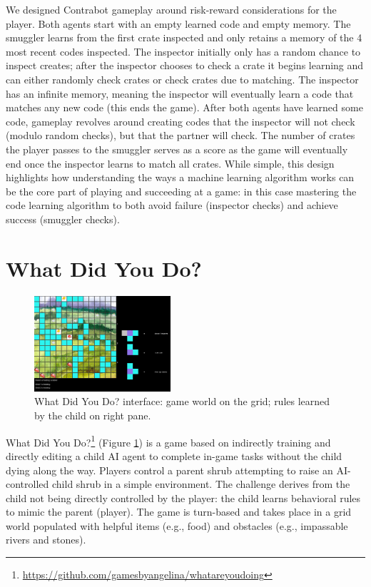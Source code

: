 \documentclass{sig-alternate}
\begin{document}
We designed {\sc Contrabot} gameplay around risk-reward considerations for the player.
Both agents start with an empty learned code and empty memory. 
The smuggler learns from the first crate inspected and only retains a memory of the 4 most recent codes inspected. 
The inspector initially only has a random chance to inspect creates; after the inspector chooses to check a crate it begins learning and can either randomly check crates or check crates due to matching.
The inspector has an infinite memory, meaning the inspector will eventually learn a code that matches any new code (this ends the game).
After both agents have learned some code, gameplay revolves around creating codes that the inspector will not check (modulo random checks), but that the partner will check.
The number of crates the player passes to the smuggler serves as a score as the game will eventually end once the inspector learns to match all crates.
While simple, this design highlights how understanding the ways a machine learning algorithm works can be the core part of playing and succeeding at a game: in this case mastering the code learning algorithm to both avoid failure (inspector checks) and achieve success (smuggler checks).


\section{What Did You Do?}
\begin{figure}[tb]
\centering
\includegraphics[width=0.45\textwidth]{images/WDYD}
\caption{{\sc What Did You Do?} interface: game world on the grid; rules learned by the child on right pane.}
\label{fig:WDYD}
\end{figure}

{\sc What Did You Do?}\footnote{\url{https://github.com/gamesbyangelina/whatareyoudoing}} (Figure \ref{fig:WDYD}) is a game based on indirectly training and directly editing a child AI agent to complete in-game tasks without the child dying along the way.
Players control a parent shrub attempting to raise an AI-controlled child shrub in a simple environment.
The challenge derives from the child not being directly controlled by the player: the child learns behavioral rules to mimic the parent (player).
The game is turn-based and takes place in a grid world populated with helpful items (e.g., food) and obstacles (e.g., impassable rivers and stones).
\end{document}
